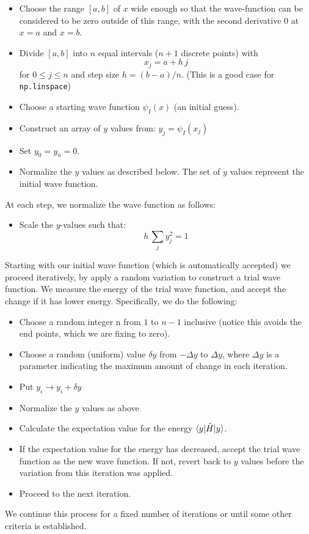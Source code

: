 \documentclass[12pt]{article}
\begin{document}
\begin{itemize}
\item Choose the range $[a,b]$ of $x$ wide enough so that the
  wave-function can be considered to be zero outside of this range,
  with the second derivative 0 at $x=a$ and $x=b$.
\item Divide $[a,b]$ into $n$ equal intervals ($n+1$ discrete points)
  with
$$x_j = a + h\,j$$ for $0 \leq j \leq n$ and step size $h = (b-a)/n$.  (This is a good case for {\tt np.linspace})
\item Choose a starting wave function $\psi_I(x)$ (an initial guess).
\item Construct an array of $y$ values from:
  $y_j = \psi_I(x_j)$
\item Set $y_0 = y_{n} = 0.$  
\item Normalize the $y$ values as described below.  The set of $y$
  values represent the initial wave function.
\end{itemize}
At each step, we normalize the wave function as follows:
\begin{itemize}  
\item Scale the $y$-values such that:
$$h \, \sum_j y_j^2 = 1$$
\end{itemize}
Starting with our initial wave function (which is automatically
accepted) we proceed iteratively, by apply a random variation to
construct a trial wave function.  We measure the energy of the trial
wave function, and accept the change if it has lower energy.
Specifically, we do the following:
\begin{itemize}
\item Choose a random integer n from $1$ to $n-1$ inclusive (notice this avoids the end points, which we are fixing to zero).
\item Choose a random (uniform) value $\delta y$ from $-\Delta y$ to $\Delta y$, where $\Delta y$ is a parameter indicating the maximum amount of change in each iteration.
\item Put $y_i \to y_i + \delta y$
\item Normalize the $y$ values as above
\item Calculate the expectation value for the energy
  $\braket{y|\hat{H}|y}$.
\item If the expectation value for the energy has decreased, accept the trial wave function as the new wave function.  If not, revert back to $y$ values before the variation from this iteration was applied.
\item Proceed to the next iteration.
\end{itemize}
We continue this process for a fixed number of iterations or until
some other criteria is established.
\end{document}

